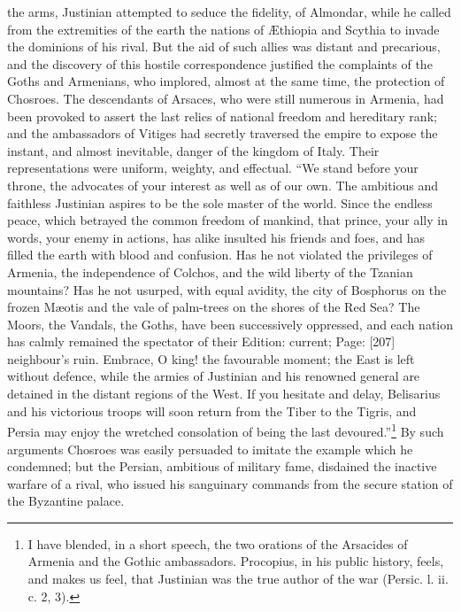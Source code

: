 the arms, Justinian attempted to seduce the fidelity, of Almondar, while he called from the extremities of the earth the nations of Æthiopia and Scythia to invade the dominions of his rival. But the aid of such allies was distant and precarious, and the discovery of this hostile correspondence justified the complaints of the Goths and Armenians, who implored, almost at the same time, the protection of Chosroes. The descendants of Arsaces, who were still numerous in Armenia, had been provoked to assert the last relics of national freedom and hereditary rank; and the ambassadors of Vitiges had secretly traversed the empire to expose the instant, and almost inevitable, danger of the kingdom of Italy. Their representations were uniform, weighty, and effectual. \texthebrew{“}We stand before your throne, the advocates of your interest as well as of our own. The ambitious and faithless Justinian aspires to be the sole master of the world. Since the endless peace, which betrayed the common freedom of mankind, that prince, your ally in words, your enemy in actions, has alike insulted his friends and foes, and has filled the earth with blood and confusion. Has he not violated the privileges of Armenia, the independence of Colchos, and the wild liberty of the Tzanian mountains? Has he not usurped, with equal avidity, the city of Bosphorus on the frozen Mæotis and the vale of palm-trees on the shores of the Red Sea? The Moors, the Vandals, the Goths, have been successively oppressed, and each nation has calmly remained the spectator of their Edition: current; Page: [207] neighbour\texthebrew{}’s ruin. Embrace, O king! the favourable moment; the East is left without defence, while the armies of Justinian and his renowned general are detained in the distant regions of the West. If you hesitate and delay, Belisarius and his victorious troops will soon return from the Tiber to the Tigris, and Persia may enjoy the wretched consolation of being the last devoured.\texthebrew{}”\footnote{I have blended, in a short speech, the two orations of the Arsacides of Armenia and the Gothic ambassadors. Procopius, in his public history, feels, and makes us feel, that Justinian was the true author of the war (Persic. l. ii. c. 2, 3).} By such arguments Chosroes was easily persuaded to imitate the example which he condemned; but the Persian, ambitious of military fame, disdained the inactive warfare of a rival, who issued his sanguinary commands from the secure station of the Byzantine palace.

